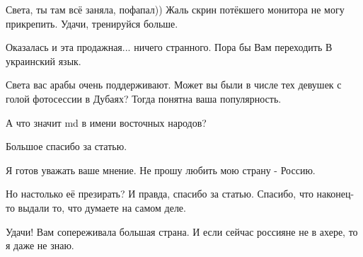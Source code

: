 \begin{itemize}
 
Света, ты там всё заняла, пофапал)) Жаль скрин потёкшего монитора не могу прикрепить. Удачи, тренируйся больше.

 
Оказалась и эта продажная... ничего странного. Пора бы Вам переходить В украинский язык.

 
Света вас арабы очень поддерживают. Может вы были в числе тех девушек с голой фотосессии в Дубаях? Тогда понятна ваша популярность.

 
А что значит md в имени восточных народов?

 

Большое спасибо за статью.

Я готов уважать ваше мнение. Не прошу любить мою страну - Россию.

Но настолько её презирать? И правда, спасибо за статью. Спасибо, что наконец-то
выдали то, что думаете на самом деле.

Удачи! Вам сопереживала большая страна. И если сейчас россияне не в ахере, то я
даже не знаю.

 

\end{itemize}
